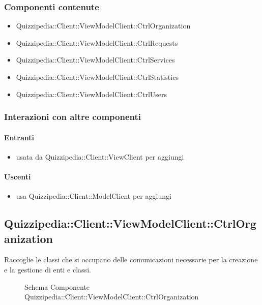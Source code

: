 \subsubsection{Componenti contenute}
\begin{itemize}
\item Quizzipedia::Client::ViewModelClient::CtrlOrganization
\item Quizzipedia::Client::ViewModelClient::CtrlRequests
\item Quizzipedia::Client::ViewModelClient::CtrlServices
\item Quizzipedia::Client::ViewModelClient::CtrlStatistics
\item Quizzipedia::Client::ViewModelClient::CtrlUsers
\end{itemize}
\subsubsection{Interazioni con altre componenti}
\paragraph{Entranti}
\begin{itemize}
\item usata da Quizzipedia::Client::ViewClient per aggiungi
\end{itemize}
\paragraph{Uscenti}
\begin{itemize}
\item usa Quizzipedia::Client::ModelClient per aggiungi
\end{itemize}
\subsection{Quizzipedia::Client::ViewModelClient::CtrlOrganization}
Raccoglie le classi che si occupano delle comunicazioni necessarie per la creazione e la gestione di enti e classi.
\begin{figure}[H]
\centering
\noindent{}
\caption[Schema Componente Quizzipedia::Client::ViewModelClient::CtrlOrganization]{Schema Componente Quizzipedia::Client::ViewModelClient::CtrlOrganization}
\end{figure}
